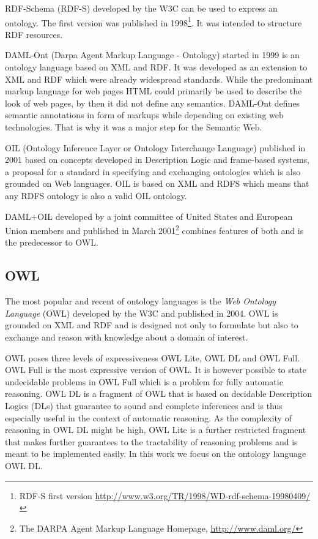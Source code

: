 RDF-Schema (RDF-S) developed by the W3C can be used to express an ontology. The first version was
published in 1998\footnote{RDF-S first version \url{http://www.w3.org/TR/1998/WD-rdf-schema-19980409/}}.
It was intended to structure RDF resources.

DAML-Ont (Darpa Agent Markup Language - Ontology) started in 1999 is an ontology language based
on XML and RDF. It was developed as an extension to XML and RDF which were already widespread
standards. While the predominant markup language for web pages HTML could primarily be used to
describe the look of web pages, by then it did not define any semantics.
DAML-Ont  defines semantic annotations in form of markups while depending on existing web technologies.
That is why it was a major step for the Semantic Web.

OIL (Ontology Inference Layer or Ontology Interchange Language) published in 2001 based on concepts
developed in Description Logic and frame-based systems, a proposal for a standard in specifying and
exchanging ontologies which is also grounded on Web languages. OIL is based on XML and RDFS which
means that any RDFS ontology is also a valid OIL ontology.

DAML+OIL developed by a joint committee of United States and European Union
members and published in March 2001\footnote{The DARPA Agent Markup Language Homepage, \url{http://www.daml.org/}}
combines features of both and is the predecessor to OWL.

\subsection{OWL} \label{subsec:OWL}
The most popular and recent of ontology languages is the \emph{Web Ontology Language} (OWL)
developed by the W3C and published in 2004.
OWL is grounded on XML and RDF and is designed not only to formulate but also to exchange
and reason with knowledge about a domain of interest.

OWL poses three levels of expressiveness OWL Lite, OWL DL and OWL Full.
OWL Full is the most expressive version of OWL.
It is however possible
to state undecidable problems in OWL Full which 
is a problem for fully automatic reasoning. OWL DL is a fragment of OWL that is based on decidable Description Logics (DLs) that guarantee to sound and complete inferences and is thus especially useful in the context of automatic reasoning. As the complexity of reasoning in OWL DL might be high, OWL Lite is a further restricted fragment that makes further guarantees to the tractability of reasoning problems and is meant to be implemented easily. In this work we focus on the ontology language OWL DL.


